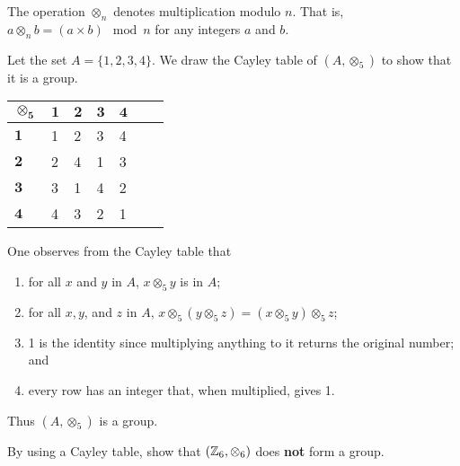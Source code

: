 \begin{definition}
    The operation $\otimes_n$ denotes multiplication modulo $n$. That is, $a \otimes_n b = (a \times b) \mod{n}$ for any integers $a$ and $b$.
\end{definition}
\begin{example}
    Let the set $A = \{1, 2, 3, 4\}$. We draw the Cayley table of $(A, \otimes_5)$ to show that it is a group.
    \begin{table}[h]
        \centering
        \begin{tabular}{|l|l|l|l|l|l|l|}
        \hline
        $\boldsymbol{\otimes_5}$ & $\boldsymbol{1}$ & $\boldsymbol{2}$ & $\boldsymbol{3}$ & $\boldsymbol{4}$ \\ \hline
        $\boldsymbol{1}$          & 1          & 2          & 3          & 4          \\ \hline
        $\boldsymbol{2}$          & 2          & 4          & 1          & 3          \\ \hline
        $\boldsymbol{3}$          & 3          & 1          & 4          & 2          \\ \hline
        $\boldsymbol{4}$          & 4          & 3          & 2          & 1          \\ \hline
        \end{tabular}
    \end{table}

    One observes from the Cayley table that
    \begin{enumerate}
        \item for all $x$ and $y$ in $A$, $x \otimes_5 y$ is in $A$;
        \item for all $x, y$, and $z$ in $A$, $x \otimes_5 (y \otimes_5 z) = (x \otimes_5 y) \otimes_5 z$;
        \item 1 is the identity since multiplying anything to it returns the original number; and
        \item every row has an integer that, when multiplied, gives 1.
    \end{enumerate}
    Thus $(A, \otimes_5)$ is a group.
\end{example}

\begin{exercise}
    By using a Cayley table, show that $(\mathbb{Z}_6, \otimes_6)$ does \textbf{not} form a group.
\end{exercise}


